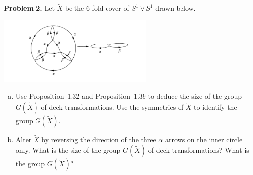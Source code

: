 \documentclass[leqno]{article}
\theoremstyle{nonumberplain}
\begin{document}
\vspace*{1cm}


\noindent\textbf{Problem 2.} Let $\tilde{X}$ be the 6-fold cover of $S^1\vee S^1$ drawn below.
\begin{center}
\includegraphics[width=3in]{SixFoldCover.png}
\end{center}
\begin{enumerate}[(a)]
\item Use Proposition~1.32 and Proposition~1.39 to deduce the size of the group $G(\tilde{X})$ of deck transformations. Use the symmetries of $\tilde{X}$ to identify the group $G(\tilde{X})$.
\item Alter $\tilde{X}$ by reversing the direction of the three $\alpha$ arrows on the inner circle only. What is the size of the group $G(\tilde{X})$ of deck transformations? What is the group $G(\tilde{X})$?
\end{enumerate}
\end{document}
